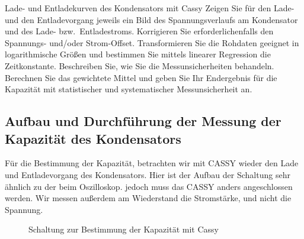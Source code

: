 \documentclass[twoside]{protokoll}
\begin{document}
 
 
\begin{aufgabe}{Lade- und Entladekurven des Kondensators mit Cassy}
  Zeigen Sie für den Lade- und den Entladevorgang jeweils ein Bild des
  Spannungsverlaufs am Kondensator und des Lade- bzw.~Entladestroms.
  Korrigieren Sie erforderlichenfalls den Spannungs- und/oder
  Strom-Offset. Transformieren Sie die Rohdaten geeignet in
  logarithmische Größen und bestimmen Sie mittels linearer Regression
  die Zeitkonstante. Beschreiben Sie, wie Sie die Messunsicherheiten
  behandeln. Berechnen Sie das gewichtete Mittel und geben Sie Ihr
  Endergebnis für die Kapazität mit statistischer und systematischer
  Messunsicherheit an.
  
\subsection{Aufbau und Durchführung der Messung der Kapazität des Kondensators}  
   

Für die Bestimmung der Kapazität, betrachten wir mit CASSY wieder den Lade und Entladevorgang des Kondensators. 
Hier ist der Aufbau der Schaltung sehr ähnlich zu der beim Oszilloskop. jedoch muss das CASSY anders angeschlossen werden.
Wir messen außerdem am Wiederstand die Stromstärke, und nicht die Spannung.

\begin{figure}[H]
    \centering
    \hfill
    \caption{Schaltung zur Bestimmung der Kapazität mit Cassy}
\end{figure}
  

\end{aufgabe}
\end{document}
